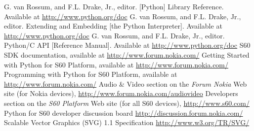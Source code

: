 %
%
%
 
\begin{thebibliography}{99}
 G. van Rossum, and F.L. Drake, Jr., editor. [Python] Library Reference. Available at \url{http://www.python.org/doc}
 G. van Rossum, and F.L. Drake, Jr., editor. Extending and Embedding [the Python Interpreter]. Available at \url{http://www.python.org/doc}
 G. van Rossum, and F.L. Drake, Jr., editor. Python/C API [Reference Manual]. Available at \url{http://www.python.org/doc}
 S60 SDK documentation, available at \url{http://www.forum.nokia.com/}
 Getting Started with Python for S60 Platform, available at \url{http://www.forum.nokia.com/}
 Programming with Python for S60 Platform,  available at \url{http://www.forum.nokia.com/}
 Audio {\&} Video section on the \textit{Forum Nokia} Web site (for Nokia devices), \url{http://www.forum.nokia.com/audiovideo}
 Developers section on the \textit{S60 Platform} Web site (for all S60 devices), \url{http://www.s60.com/}
 Python for S60 developer discussion board \url{http://discussion.forum.nokia.com/}
 Scalable Vector Graphics (SVG) 1.1 Specification \url{http://www.w3.org/TR/SVG/}
\end{thebibliography}
